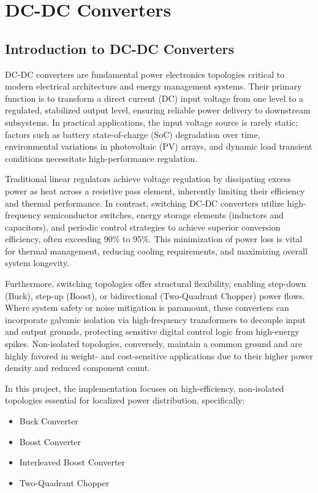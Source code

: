 
\section{DC-DC Converters}

\subsection{Introduction to DC-DC Converters}
DC-DC converters are fundamental power electronics topologies critical to modern electrical architecture and energy management systems. Their primary function is to transform a direct current (DC) input voltage from one level to a regulated, stabilized output level, ensuring reliable power delivery to downstream subsystems. In practical applications, the input voltage source is rarely static; factors such as battery state-of-charge (SoC) degradation over time, environmental variations in photovoltaic (PV) arrays, and dynamic load transient conditions necessitate high-performance regulation.

Traditional linear regulators achieve voltage regulation by dissipating excess power as heat across a resistive pass element, inherently limiting their efficiency and thermal performance. In contrast, switching DC-DC converters utilize high-frequency semiconductor switches, energy storage elements (inductors and capacitors), and periodic control strategies to achieve superior conversion efficiency, often exceeding 90\% to 95\%. This minimization of power loss is vital for thermal management, reducing cooling requirements, and maximizing overall system longevity.

Furthermore, switching topologies offer structural flexibility, enabling step-down (Buck), step-up (Boost), or bidirectional (Two-Quadrant Chopper) power flows. Where system safety or noise mitigation is paramount, these converters can incorporate galvanic isolation via high-frequency transformers to decouple input and output grounds, protecting sensitive digital control logic from high-energy spikes. Non-isolated topologies, conversely, maintain a common ground and are highly favored in weight- and cost-sensitive applications due to their higher power density and reduced component count.

In this project, the implementation focuses on high-efficiency, non-isolated topologies essential for localized power distribution, specifically:
\begin{itemize}
    \item Buck Converter
    \item Boost Converter
    \item Interleaved Boost Converter
    \item Two-Quadrant Chopper
\end{itemize}

